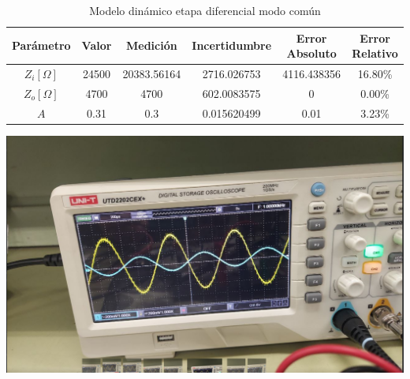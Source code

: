 \begin{table}[h!]
\centering
\begin{tabular}{|c|c|c|c|c|c|}
\hline
\textbf{Parámetro} & \textbf{Valor} & \textbf{Medición} & \textbf{Incertidumbre} & \textbf{Error Absoluto} & \textbf{Error Relativo} \\ \hline
$Z_i [\Omega]$ & 24500 & 20383.56164 & 2716.026753 & 4116.438356 & 16.80\% \\ \hline
$Z_o [\Omega]$ & 4700 & 4700 & 602.0083575 & 0 & 0.00\% \\ \hline
$A$ & 0.31 & 0.3 & 0.015620499 & 0.01 & 3.23\% \\ \hline
\end{tabular}
\caption{Modelo dinámico etapa diferencial modo común}
\label{tab:med-modelo-dinamico-etapa-diferencial-modo-comun}
\end{table}


\begin{ilustracion}[ht]
    \centering
    \includegraphics[width=1.0\textwidth]{src/images/resultados/p2/med-ganancia-mod-comun.png}
    \caption{Ganancia etapa diferencial modo común}
    \label{ilus:ganancia-etapa-diff-mod-comun}
\end{ilustracion}

